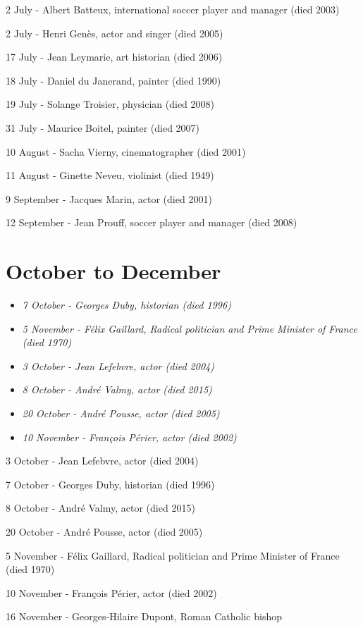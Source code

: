 2 July - Albert Batteux, international soccer player and manager (died
2003)

2 July - Henri Genès, actor and singer (died 2005)

17 July - Jean Leymarie, art historian (died 2006)

18 July - Daniel du Janerand, painter (died 1990)

19 July - Solange Troisier, physician (died 2008)

31 July - Maurice Boitel, painter (died 2007)

10 August - Sacha Vierny, cinematographer (died 2001)

11 August - Ginette Neveu, violinist (died 1949)

9 September - Jacques Marin, actor (died 2001)

12 September - Jean Prouff, soccer player and manager (died 2008)

\section{October to December}\label{october-to-december}

\begin{itemize}
\item
  \emph{7 October - Georges Duby, historian (died 1996)}
\item
  \emph{5 November - Félix Gaillard, Radical politician and Prime
  Minister of France (died 1970)}
\item
  \emph{3 October - Jean Lefebvre, actor (died 2004)}
\item
  \emph{8 October - André Valmy, actor (died 2015)}
\item
  \emph{20 October - André Pousse, actor (died 2005)}
\item
  \emph{10 November - François Périer, actor (died 2002)}
\end{itemize}

3 October - Jean Lefebvre, actor (died 2004)

7 October - Georges Duby, historian (died 1996)

8 October - André Valmy, actor (died 2015)

20 October - André Pousse, actor (died 2005)

5 November - Félix Gaillard, Radical politician and Prime Minister of
France (died 1970)

10 November - François Périer, actor (died 2002)

16 November - Georges-Hilaire Dupont, Roman Catholic bishop


